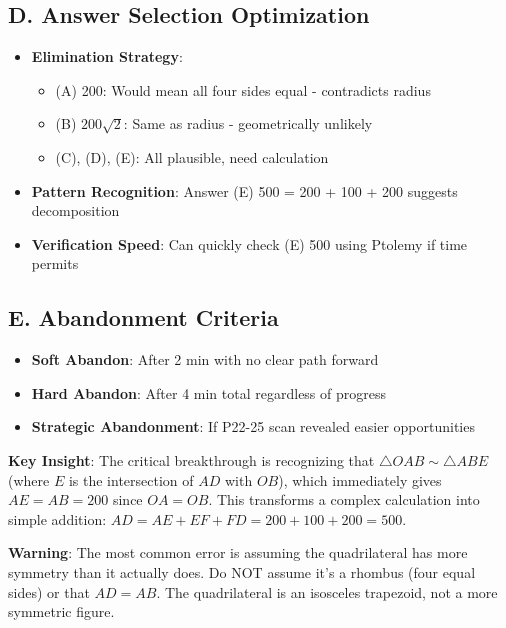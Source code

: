 \documentclass[12pt]{article}
\begin{document}
\begin{competitionbox}
\subsection*{D. Answer Selection Optimization}
\begin{itemize}[leftmargin=*]
    \item \textbf{Elimination Strategy}: 
    \begin{itemize}
        \item (A) 200: Would mean all four sides equal - contradicts radius
        \item (B) $200\sqrt{2}$: Same as radius - geometrically unlikely
        \item (C), (D), (E): All plausible, need calculation
    \end{itemize}
    \item \textbf{Pattern Recognition}: Answer (E) 500 = 200 + 100 + 200 suggests decomposition
    \item \textbf{Verification Speed}: Can quickly check (E) 500 using Ptolemy if time permits
\end{itemize}

\subsection*{E. Abandonment Criteria}
\begin{itemize}[leftmargin=*]
    \item \textbf{Soft Abandon}: After 2 min with no clear path forward
    \item \textbf{Hard Abandon}: After 4 min total regardless of progress
    \item \textbf{Strategic Abandonment}: If P22-25 scan revealed easier opportunities
\end{itemize}
\end{competitionbox}

\begin{keyinsightbox}
\textbf{Key Insight}: The critical breakthrough is recognizing that $\triangle OAB \sim \triangle ABE$ (where $E$ is the intersection of $AD$ with $OB$), which immediately gives $AE = AB = 200$ since $OA = OB$. This transforms a complex calculation into simple addition: $AD = AE + EF + FD = 200 + 100 + 200 = 500$.
\end{keyinsightbox}

\begin{warningbox}
\textbf{Warning}: The most common error is assuming the quadrilateral has more symmetry than it actually does. Do NOT assume it's a rhombus (four equal sides) or that $AD = AB$. The quadrilateral is an isosceles trapezoid, not a more symmetric figure.
\end{warningbox}
\end{document}
